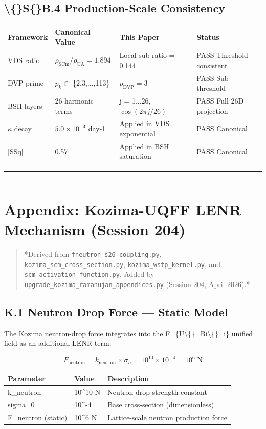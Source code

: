 \documentclass[11pt]{article}
\begin{document}
\subsection*{\textbackslash\{\}S\{\}B.4 Production-Scale Consistency}

\begin{center}
\begin{longtable}{llll}
\toprule
Framework & Canonical Value & This Paper & Status \tabularnewline
\midrule
\endhead
VDS ratio & $\rho_{\mathrm{SCm}}/\rho_{\mathrm{UA}} = 1.894$ & Local sub-ratio = 0.144 & PASS Threshold-consistent \tabularnewline
DVP prime & $p_k \in$ \{2,3,...,113\} & $p_{\mathrm{DVP}} = 3$ & PASS Sub-threshold \tabularnewline
BSH layers & 26 harmonic terms & j = 1...26, $\cos(2\pi j/26)$ & PASS Full 26D projection \tabularnewline
$\kappa$ decay & $5.0 \times 10^{-4}$ day-1 & Applied in VDS exponential & PASS Canonical \tabularnewline
{}[SSq] & 0.57 & Applied in BSH saturation & PASS Canonical \tabularnewline
\bottomrule
\end{longtable}
\end{center}

\noindent\rule{\textwidth}{0.4pt}

\noindent\rule{\textwidth}{0.4pt}

\section*{Appendix: Kozima-UQFF LENR Mechanism (Session 204)}

\begin{quote}
*Derived from \verb|fneutron_s26_coupling.py|, \verb|kozima_scm_cross_section.py|,
\verb|kozima_wstp_kernel.py|, and \verb|scm_activation_function.py|. Added by
\verb|upgrade_kozima_ramanujan_appendices.py| (Session 204, April 2026).*
\end{quote}

\subsection*{K.1 Neutron Drop Force --- Static Model}

The Kozima neutron-drop force integrates into the F\_\{U\textbackslash\{\}\_Bi\textbackslash\{\}\_i\} unified field as an additional LENR term:

$$F_{\mathrm{neutron}} = k_{\mathrm{neutron}} \times \sigma_n = 10^{10} \times 10^{-4} = 10^6 \;\text{N}$$

\begin{center}
\begin{longtable}{lll}
\toprule
Parameter & Value & Description \tabularnewline
\midrule
\endhead
k\_neutron & 10\textasciicircum{}10 N & Neutron-drop strength constant \tabularnewline
sigma\_0 & 10\textasciicircum{}-4 & Base cross-section (dimensionless) \tabularnewline
F\_neutron (static) & 10\textasciicircum{}6 N & Lattice-scale neutron production force \tabularnewline
\bottomrule
\end{longtable}
\end{center}
\end{document}
